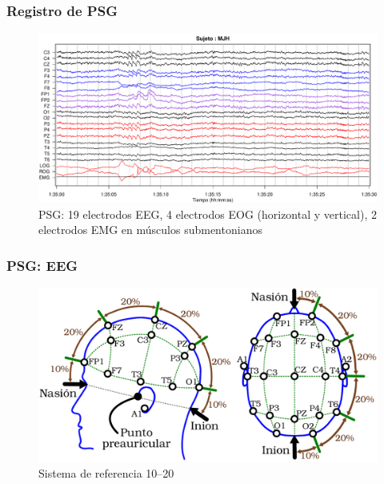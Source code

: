 \documentclass{beamer}
\begin{document}

\begin{frame}\frametitle{Registro de PSG}
\begin{figure}
\centering
\includegraphics[width=0.9\linewidth]{./p_170427/MJH_190_PDG_lucirse_PSG.pdf}
\caption{PSG: 19 electrodos EEG, 4 electrodos EOG (horizontal y vertical), 2 electrodos EMG en 
m\'usculos submentonianos}
\end{figure}
\end{frame}


\begin{frame}\frametitle{PSG: EEG}
\begin{figure}
\centering
\includegraphics[width=0.9\linewidth]{cabeza_hecha.pdf} 
\caption{Sistema de referencia 10--20}
\end{figure}
\end{frame}

\end{document}
